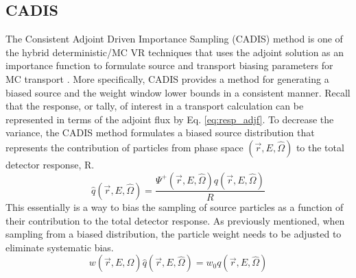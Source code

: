 \subsection{CADIS}
The Consistent Adjoint Driven Importance Sampling (CADIS) method is one of the
hybrid deterministic/MC VR
techniques that uses the adjoint solution as an importance function to 
formulate source and transport biasing parameters for MC transport \cite{cadis}.
More specifically, CADIS provides a method for generating
a biased source and the weight window lower bounds in a consistent manner.
Recall that the response, or tally, of interest in a transport calculation can be 
represented in terms of the adjoint flux by Eq. \ref{eq:resp_adjf}.
To decrease the variance, the CADIS method formulates a biased
source distribution that represents the contribution of particles from phase space
$(\overrightarrow{r}, E, \widehat{\Omega})$ 
to the total detector response, R.
\begin{equation} \label{eq:3.8}
	\widehat{q}(\overrightarrow{r}, E, \widehat{\Omega}) =
	\frac{\Psi^{+}(\overrightarrow{r}, E,\widehat{\Omega})
	q(\overrightarrow{r}, E, \widehat{\Omega})}{R}
\end{equation}
This essentially is a way to bias the sampling of source particles as a function of their 
contribution to the total detector response.
As previously mentioned, when sampling from a biased distribution, the particle weight
needs to be adjusted to eliminate systematic bias.  
\begin{equation} \label{eq:3.9}
	w(\overrightarrow{r}, E,
	\widehat{\Omega})\widehat{q}(\overrightarrow{r}, E, \widehat{\Omega})=
	w_{0}q(\overrightarrow{r}, E, \widehat{\Omega})
\end{equation}
